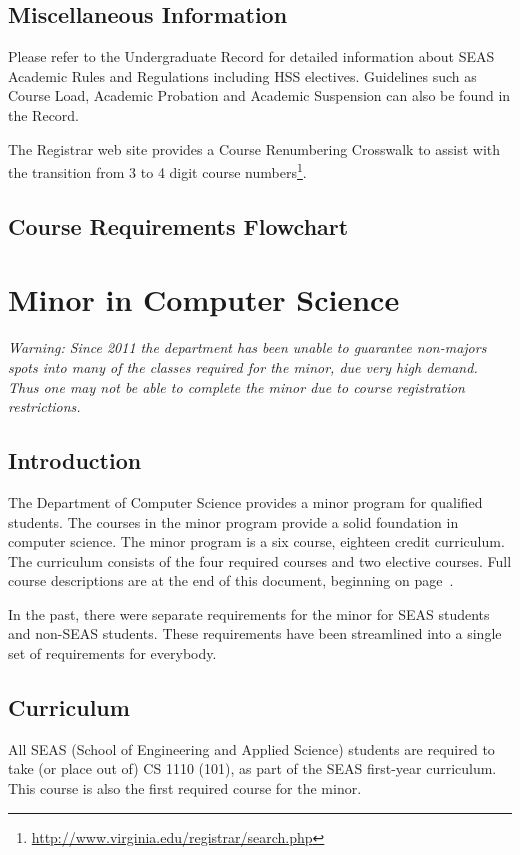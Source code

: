 \documentclass[10pt,letter]{book}
\newcommand{\mychapter}[2]{\chapter{#1}\renewcommand{\leftmark}{\textsc{#2}}}
\newcommand{\mysection}[1]{\section{#1}\renewcommand{\rightmark}{#1}}
\newcommand{\myurl}[1]{\footnote{\scriptsize\url{#1}}}
\begin{document}
\mysection{Miscellaneous Information}

Please refer to the Undergraduate Record for detailed information
about SEAS Academic Rules and Regulations including HSS
electives. Guidelines such as Course Load, Academic Probation and
Academic Suspension can also be found in the Record.

The Registrar web site provides a Course Renumbering Crosswalk to
assist with the transition from 3 to 4 digit course
numbers\myurl{http://www.virginia.edu/registrar/search.php}.



\clearpage
\mysection{Course Requirements Flowchart}

\begin{figure}[h!]
\end{figure}


\clearpage
\mychapter{Minor in Computer Science}{CS Minor}
\label{sec:csminor}

{\Large\em Warning: Since 2011 the department has been unable to
  guarantee non-majors spots into many of the classes required for the
  minor, due very high demand.  Thus one may not be able to complete
  the minor due to course registration restrictions.}

\mysection{Introduction}

The Department of Computer Science provides a minor program for
qualified students. The courses in the minor program provide a solid
foundation in computer science. The minor program is a six course,
eighteen credit curriculum. The curriculum consists of the four
required courses and two elective courses. Full course descriptions
are at the end of this document, beginning on
page~\pageref{sec:coursedesc}.

In the past, there were separate requirements for the minor for SEAS
students and non-SEAS students.  These requirements have been
streamlined into a single set of requirements for everybody.
 
\mysection{Curriculum}

All SEAS (School of Engineering and Applied Science) students are
required to take (or place out of) CS 1110 (101), as part of the SEAS
first-year curriculum. This course is also the first required course
for the minor.
\end{document}
